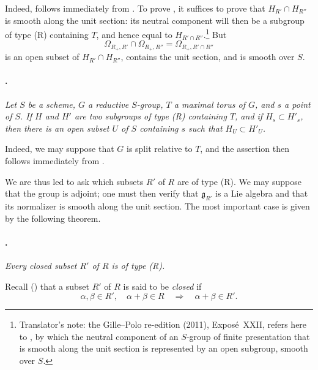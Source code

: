 Indeed, \textup{} follows immediately from \textup{}. To
prove \textup{}, it suffices to prove that
\(H_{R'}\cap H_{R''}\) is smooth along the unit section:
its neutral component will then be a subgroup of type
\textup{(R)} containing \(T\), and hence equal to
\(H_{R'\cap R''}\).\footnote{Translator's note: the Gille--Polo re-edition (2011), Exposé~XXII, refers
here to , by which the neutral component of an
\(S\)-group of finite presentation that is smooth along the unit section is
represented by an open subgroup, smooth over \(S\).} But
\[
  \Omega_{R_+,R'}\cap\Omega_{R_+,R''}
  =
  \Omega_{R_+,R'\cap R''}
\]
is an open subset of \(H_{R'}\cap H_{R''}\), contains the unit
section, and is smooth over \(S\).

\paragraph{.}
\textit{Let \(S\) be a scheme, \(G\) a reductive \(S\)-group, \(T\)
a maximal torus of \(G\), and \(s\) a point of \(S\). If \(H\) and
\(H'\) are two subgroups of type \textup{(R)} containing \(T\), and
if \(H_s\subset H'_s\), then there is an open subset \(U\) of \(S\)
containing \(s\) such that \(H_U\subset H'_U\).}

Indeed, we may suppose that \(G\) is split relative to \(T\), and
the assertion then follows immediately from  \textup{}.

We are thus led to ask which subsets \(R'\) of \(R\) are of type
\textup{(R)}. We may suppose that the group is adjoint; one must
then verify that \(\mathfrak g_{R'}\) is a Lie algebra and that its
normalizer is smooth along the unit section. The most
important case is given by the following theorem.

\paragraph{.}
\textit{Every closed subset \(R'\) of \(R\) is of type
\textup{(R)}.}

Recall \textup{()} that a subset \(R'\) of \(R\)
is said to be \emph{closed} if
\[
  \alpha,\beta\in R',\quad \alpha+\beta\in R
  \quad\Longrightarrow\quad
  \alpha+\beta\in R'.
\]

